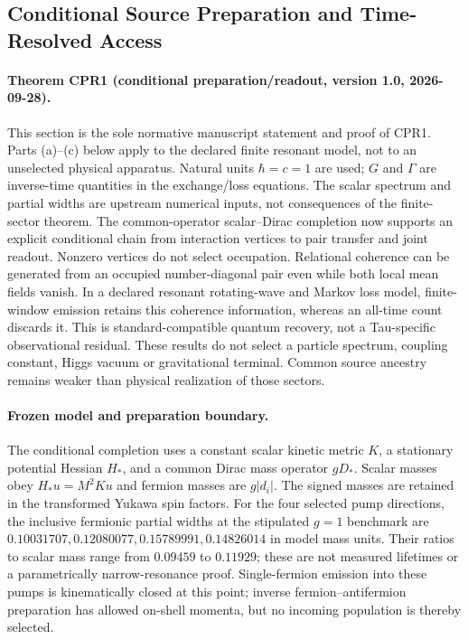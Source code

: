 \documentclass[11pt]{article}
\begin{document}
\subsection{Conditional Source Preparation and Time-Resolved Access}
\label{sec:common-operator-preparation-readout}
\hypertarget{cpr1}{}
\paragraph{Theorem CPR1 (conditional preparation/readout, version 1.0,
2026-09-28).}\label{thm:cpr1}
This section is the sole normative manuscript statement and proof of CPR1.
Parts (a)--(c) below apply to the declared finite resonant model, not to an
unselected physical apparatus. Natural units $\hbar=c=1$ are used; $G$ and
$\Gamma$ are inverse-time quantities in the exchange/loss equations.
The scalar spectrum and partial widths are upstream numerical inputs,
not consequences of the finite-sector theorem.
The common-operator scalar--Dirac completion now supports an explicit
conditional chain from interaction vertices to pair transfer and joint
readout. Nonzero vertices do not select occupation. Relational coherence
can be generated from an occupied number-diagonal pair even while both
local mean fields vanish. In a declared resonant rotating-wave and Markov
loss model, finite-window emission retains this coherence information,
whereas an all-time count discards it. This is standard-compatible quantum
recovery, not a Tau-specific observational residual.
These results do not select a particle spectrum, coupling constant, Higgs vacuum or gravitational terminal. Common source ancestry remains weaker than physical realization of those sectors.
\paragraph{Frozen model and preparation boundary.}
The conditional completion uses a constant scalar kinetic metric $K$, a
stationary potential Hessian $H_*$, and a common Dirac mass operator $gD_*$.
Scalar masses obey $H_*u=M^2Ku$ and fermion masses are $g|d_i|$.
The signed masses are retained in the transformed Yukawa spin factors.
For the four selected pump directions, the inclusive fermionic partial
widths at the stipulated $g=1$ benchmark are
$0.10031707,0.12080077,0.15789991,0.14826014$ in model mass units.
Their ratios to scalar mass range from $0.09459$ to $0.11929$; these are
not measured lifetimes or a parametrically narrow-resonance proof.
Single-fermion emission into these pumps is kinematically closed at this
point; inverse fermion--antifermion preparation has allowed on-shell
momenta, but no incoming population is thereby selected.
\end{document}
